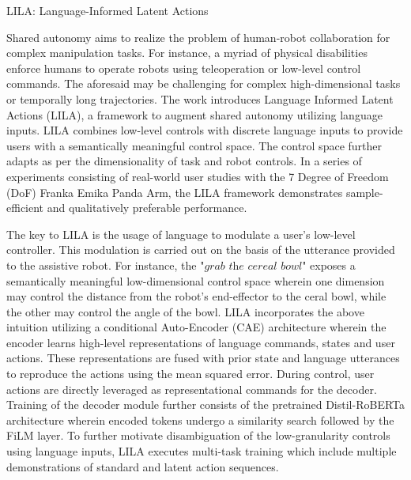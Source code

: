 \documentclass[12pt,letterpaper]{article}
\begin{document}
\begin{center}
  \large{LILA: Language-Informed Latent Actions}
\end{center}

Shared autonomy aims to realize the problem of human-robot collaboration for complex manipulation tasks. For instance, a myriad of physical disabilities enforce humans to operate robots using teleoperation or low-level control commands. The aforesaid may be challenging for complex high-dimensional tasks or temporally long trajectories. The work introduces Language Informed Latent Actions (LILA), a framework to augment shared autonomy utilizing language inputs. LILA combines low-level controls with discrete language inputs to provide users with a semantically meaningful control space. The control space further adapts as per the dimensionality of task and robot controls. In a series of experiments consisting of real-world user studies with the 7 Degree of Freedom (DoF) Franka Emika Panda Arm, the LILA framework demonstrates sample-efficient and qualitatively preferable performance.

The key to LILA is the usage of language to modulate a user's low-level controller. This modulation is carried out on the basis of the utterance provided to the assistive robot. For instance, the $\textit{"grab the cereal bowl"}$ exposes a semantically meaningful low-dimensional control space wherein one dimension may control the distance from the robot's end-effector to the ceral bowl, while the other may control the angle of the bowl. LILA incorporates the above intuition utilizing a conditional Auto-Encoder (CAE) architecture wherein the encoder learns high-level representations of language commands, states and user actions. These representations are fused with prior state and language utterances to reproduce the actions using the mean squared error. During control, user actions are directly leveraged as representational commands for the decoder. Training of the decoder module further consists of the pretrained Distil-RoBERTa architecture wherein encoded tokens undergo a similarity search followed by the FiLM layer. To further motivate disambiguation of the low-granularity controls using language inputs, LILA executes multi-task training which include multiple demonstrations of standard and latent action sequences. 
\end{document}
